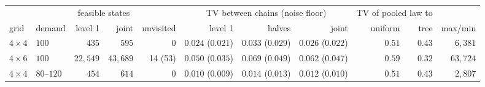 \begin{tabular}{llrrrrrrrrr}
\toprule
 & & \multicolumn{2}{c}{feasible states} & & \multicolumn{3}{c}{TV between chains (noise floor)} & \multicolumn{2}{c}{TV of pooled law to} & \\
\cmidrule(lr){3-4}\cmidrule(lr){6-8}\cmidrule(lr){9-10}
grid & demand & level 1 & joint & unvisited & level 1 & halves & joint & uniform & tree & max/min \\
\midrule
$4\times4$ & $100$ & $435$ & $595$ & 0 & $0.024$ ($0.021$) & $0.033$ ($0.029$) & $0.026$ ($0.022$) & $0.51$ & $0.43$ & $6{,}381$ \\
$4\times6$ & $100$ & $22{,}549$ & $43{,}689$ & 14 (53) & $0.050$ ($0.035$) & $0.069$ ($0.049$) & $0.062$ ($0.047$) & $0.59$ & $0.32$ & $63{,}724$ \\
\midrule
$4\times4$ & $80$--$120$ & $454$ & $614$ & 0 & $0.010$ ($0.009$) & $0.014$ ($0.013$) & $0.012$ ($0.010$) & $0.51$ & $0.43$ & $2{,}807$ \\
\bottomrule
\end{tabular}
